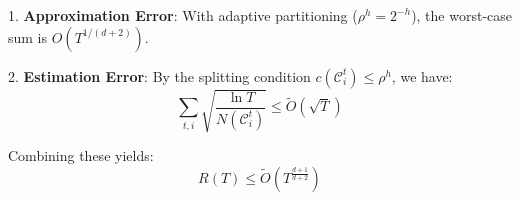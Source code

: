 1. \textbf{Approximation Error}:  
   With adaptive partitioning ($\rho^h = 2^{-h}$), the worst-case sum is $O(T^{1/(d+2)})$.

2. \textbf{Estimation Error}:  
   By the splitting condition $c(\mathcal{C}_i^t) \leq \rho^h$, we have:
   \[
   \sum_{t,i} \sqrt{\frac{\ln T}{N(\mathcal{C}_i^t)}} \leq \tilde{O}\left(\sqrt{T}\right)
   \]

\noindent Combining these yields:
\begin{equation}
R(T) \leq \tilde{O}\left(T^{\frac{d+1}{d+2}}\right) \label{eq:final_bound}
\end{equation}





